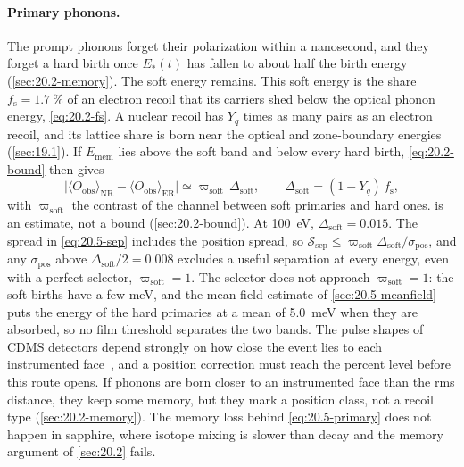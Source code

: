 \paragraph{Primary phonons.} The prompt phonons forget their polarization within a nanosecond, and they forget a hard birth once $E_*(t)$ has fallen to about half the birth energy (\cref{sec:20.2-memory}). The soft energy remains. This soft energy is the share $f_{\mathrm{s}} = \SI{1.7}{\percent}$ of an electron recoil that its carriers shed below the optical phonon energy, \cref{eq:20.2-fs}. A nuclear recoil has $Y_q$ times as many pairs as an electron recoil, and its lattice share is born near the optical and zone-boundary energies (\cref{sec:19.1}). If $E_{\mathrm{mem}}$ lies above the soft band and below every hard birth, \cref{eq:20.2-bound} then gives
\begin{equation}
  \bigl|\langle O_{\mathrm{obs}}\rangle_{\mathrm{NR}} - \langle O_{\mathrm{obs}}\rangle_{\mathrm{ER}}\bigr| \simeq \varpi_{\mathrm{soft}}\,\Delta_{\mathrm{soft}} , \qquad \Delta_{\mathrm{soft}} = (1 - Y_q)\,f_{\mathrm{s}} ,
  \label{eq:20.5-primary}
\end{equation}
with $\varpi_{\mathrm{soft}}$ the contrast of the channel between soft primaries and hard ones.  is an estimate, not a bound (\cref{sec:20.2-bound}). At \SI{100}{eV}, $\Delta_{\mathrm{soft}} = 0.015$. The spread in \cref{eq:20.5-sep} includes the position spread, so $\mathcal{S}_{\mathrm{sep}} \le \varpi_{\mathrm{soft}}\Delta_{\mathrm{soft}}/\sigma_{\mathrm{pos}}$, and any $\sigma_{\mathrm{pos}}$ above $\Delta_{\mathrm{soft}}/2 = 0.008$ excludes a useful separation at every energy, even with a perfect selector, $\varpi_{\mathrm{soft}} = 1$. The selector does not approach $\varpi_{\mathrm{soft}} = 1$: the soft births have a few meV, and the mean-field estimate of \cref{sec:20.5-meanfield} puts the energy of the hard primaries at a mean of \SI{5.0}{meV} when they are absorbed, so no film threshold separates the two bands. The pulse shapes of CDMS detectors depend strongly on how close the event lies to each instrumented face~\cite[Sect.~2]{hertel2012phonon}, and a position correction must reach the percent level before this route opens. If phonons are born closer to an instrumented face than the rms distance, they keep some memory, but they mark a position class, not a recoil type (\cref{sec:20.2-memory}). The memory loss behind \cref{eq:20.5-primary} does not happen in sapphire, where isotope mixing is slower than decay and the memory argument of \cref{sec:20.2} fails.

